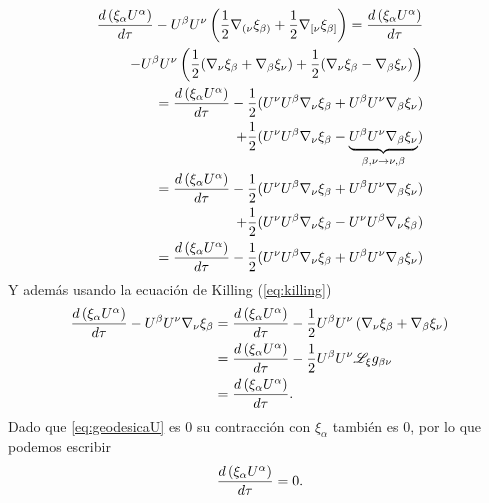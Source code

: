 \begin{equation}
    \begin{aligned}
        \frac{d \left(\xi_\alpha U^\alpha\right)}{d  \tau} - U^\beta U^\nu \left(\frac{1}{2}\mathbf{\nabla}_{(\nu }\xi_{\beta)} + \frac{1}{2}\mathbf{\nabla}_{[\nu }\xi_{\beta]}\right)  = \frac{d \left(\xi_\alpha U^\alpha\right)}{d  \tau}
        \\ -U^\beta U^\nu \left(\frac{1}{2}(\mathbf{\nabla}_{\nu }\xi_{\beta} + \mathbf{\nabla}_{\beta }\xi_{\nu}) + \frac{1}{2}(\mathbf{\nabla}_{\nu }\xi_{\beta} - \mathbf{\nabla}_{\beta }\xi_{\nu})\right) \\
        =\frac{d \left(\xi_\alpha U^\alpha\right)}{d  \tau} - \frac{1}{2}(U^\nu U^\beta  \mathbf{\nabla}_{\nu }\xi_{\beta} + U^\beta U^\nu\mathbf{\nabla}_{\beta }\xi_{\nu})   \\
        + \frac{1}{2}( U^\nu U^\beta \mathbf{\nabla}_{\nu }\xi_{\beta} - \underbrace{U^\beta U^\nu\mathbf{\nabla}_{\beta }\xi_{\nu}}_{\beta,\nu \rightarrow \nu,\beta}) \\
        =\frac{d \left(\xi_\alpha U^\alpha\right)}{d  \tau} - \frac{1}{2}(U^\nu U^\beta  \mathbf{\nabla}_{\nu }\xi_{\beta} + U^\beta U^\nu\mathbf{\nabla}_{\beta }\xi_{\nu})   \\
        + \frac{1}{2}( U^\nu U^\beta \mathbf{\nabla}_{\nu }\xi_{\beta} -  U^\nu U^\beta \mathbf{\nabla}_{\nu }\xi_{\beta})                                              \\
        =\frac{d \left(\xi_\alpha U^\alpha\right)}{d  \tau} - \frac{1}{2}(U^\nu U^\beta  \mathbf{\nabla}_{\nu }\xi_{\beta} + U^\beta U^\nu\mathbf{\nabla}_{\beta }\xi_{\nu})
    \end{aligned}
\end{equation}
Y además usando la ecuación de Killing (\ref{eq:killing})
\begin{equation}
    \begin{aligned}
        \frac{d \left(\xi_\alpha U^\alpha\right)}{d  \tau} - U^\beta U^\nu \mathbf{\nabla}_\nu \xi_\beta & = \frac{d \left(\xi_\alpha U^\alpha\right)}{d  \tau} - \frac{1}{2}U^\beta U^\nu  \left( \mathbf{\nabla}_\nu \xi_\beta + \mathbf{\nabla}_\beta \xi_\nu \right) \\
                                                                                             & = \frac{d \left(\xi_\alpha U^\alpha\right)}{d  \tau} - \frac{1}{2}U^\beta U^\nu \mathscr{L}_\xi g_{\beta \nu}                                       \\
                                                                                             & = \frac{d \left(\xi_\alpha U^\alpha\right)}{d  \tau}.
    \end{aligned}
\end{equation}
Dado que \ref{eq:geodesicaU} es $0$ su contracción con $\xi_\alpha$ también es $0$, por lo que podemos escribir
\begin{equation}
    \frac{d \left(\xi_\alpha U^\alpha\right)}{d  \tau} = 0.
\end{equation}

